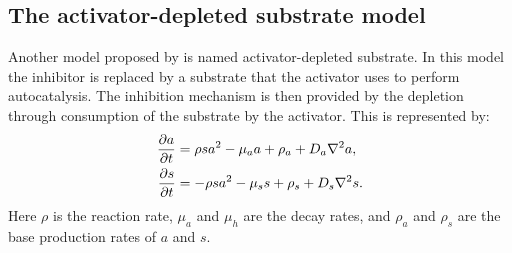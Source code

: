 \subsection{The activator-depleted substrate model}
Another model proposed by \citet{meinhardt1982} is named activator-depleted substrate. In this model the inhibitor is replaced by a substrate that the activator uses to perform autocatalysis. The inhibition mechanism is then provided by the depletion through consumption of the substrate by the activator. This is represented by:
	\begin{equation}
	\begin{aligned} \label{eq:activatorSubstrateRD}
		\frac{\partial a}{\partial t} &= \rho sa^2 - \mu_a a + \rho_a + D_a \nabla^2 a,\\
		\frac{\partial s}{\partial t} &= -\rho sa^2 - \mu_s s + \rho_s + D_s \nabla^2 s.
	\end{aligned}
	\end{equation}
Here $\rho$ is the reaction rate, $\mu_a$ and $\mu_h$ are the decay rates, and $\rho_a$ and $\rho_s$ are the base production rates of $a$ and $s$.

